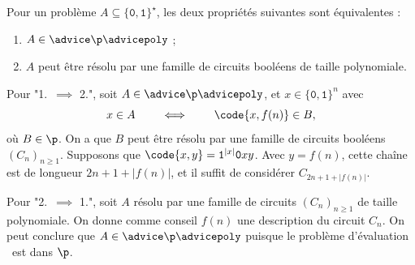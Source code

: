 \documentclass[./main]{subfiles}
\begin{document}
  \begin{thm}
    Pour un problème $A \subseteq \{\texttt{0}, \texttt{1}\}^{\star}$, les deux propriétés suivantes sont équivalentes :
    \begin{enumerate}
      \item $A \in \advice \p \advicepoly$ ;
      \item $A$ peut être résolu par une famille de circuits booléens de taille polynomiale.
    \end{enumerate}
  \end{thm}
  \begin{prv}
    Pour "1.\ $\implies$ 2.", soit $A \in \advice \p \advicepoly$, et $x \in \{\texttt{0}, \texttt{1}\}^n$ avec
    \[
      x \in A \quad\quad \iff \quad\quad \code{x, f(n)} \in B
    ,\] 
    où $B \in \p$.
    On a que $B$ peut être résolu par une famille de circuits booléens $(C_n)_{n \ge 1}$.
    Supposons que $\code{x, y} = \texttt{1}^{|x|} \texttt{0} x y$.
    Avec $y = f(n)$, cette chaîne est de longueur $2n + 1 + |f(n)|$, et il suffit de considérer $C_{2n + 1 + |f(n)|}$.

    Pour "2.\ $\implies$ 1.", soit $A$ résolu par une famille de circuits $(C_n)_{n \ge 1}$ de taille polynomiale.
    On donne comme conseil $f(n)$ une description du circuit $C_n$.
    On peut conclure que $A \in \advice \p \advicepoly$ puisque le problème d'évaluation \pbValCirc\ est dans $\p$.
  \end{prv}
\end{document}
